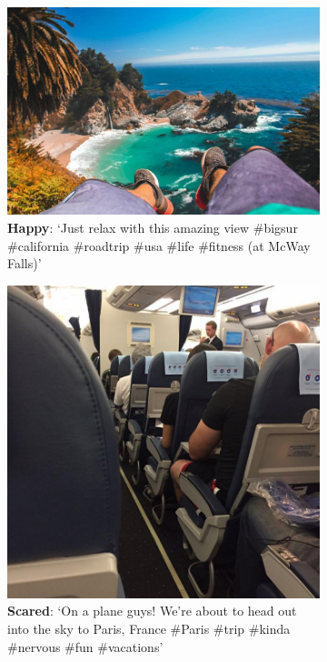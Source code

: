 \begin{figure}
\begin{subfigure}[t]{.5\textwidth}
  \vskip 0pt %
  \centering
  \includegraphics[width=.8\linewidth]{Images/happy.jpg}
  \caption{\textbf{Happy}: `Just relax with this amazing view \#bigsur \#california \#roadtrip \#usa \#life \#fitness (at McWay Falls)'}
\end{subfigure}
\begin{subfigure}[t]{.5\textwidth}
  \vskip 0pt 
  \centering
  \includegraphics[width=.7\linewidth]{Images/scared.jpg}
  \caption{\textbf{Scared}: `On a plane guys! We're about to head out into the sky to Paris, France \#Paris \#trip \#kinda \#nervous \#fun \#vacations'}
\end{subfigure}
\begin{subfigure}[t]{.5\textwidth}
  \vskip 0pt
  \centering

\end{subfigure}
\end{figure}
